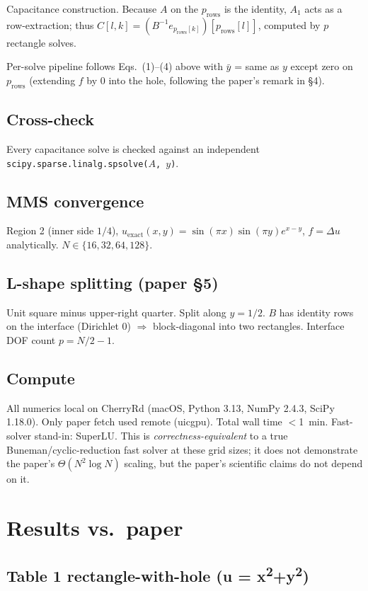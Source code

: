 \documentclass[11pt]{article}
\begin{document}
Capacitance construction. Because $A$ on the $p_{\text{rows}}$ is the
identity, $A_1$ acts as a row-extraction; thus
$C[l,k] = (B^{-1} e_{p_{\text{rows}}[k]})[p_{\text{rows}}[l]]$, computed by $p$
rectangle solves.

Per-solve pipeline follows Eqs.~(1)--(4) above with $\bar y$ = same as $y$
except zero on $p_{\text{rows}}$ (extending $f$ by $0$ into the hole,
following the paper's remark in \S4).

\subsection{Cross-check}
Every capacitance solve is checked against an independent
\texttt{scipy.sparse.linalg.spsolve($A$, $y$)}.

\subsection{MMS convergence}
Region 2 (inner side $1/4$), $u_{\text{exact}}(x,y) = \sin(\pi x)\sin(\pi y) e^{x-y}$,
$f = \Delta u$ analytically. $N \in \{16, 32, 64, 128\}$.

\subsection{L-shape splitting (paper \S5)}
Unit square minus upper-right quarter. Split along $y = 1/2$. $B$ has
identity rows on the interface (Dirichlet 0) $\Rightarrow$ block-diagonal
into two rectangles. Interface DOF count $p = N/2 - 1$.

\subsection{Compute}
All numerics local on CherryRd (macOS, Python 3.13, NumPy 2.4.3, SciPy
1.18.0). Only paper fetch used remote (uicgpu). Total wall time
${<}$1~min. Fast-solver stand-in: SuperLU. This is
\emph{correctness-equivalent} to a true Buneman/cyclic-reduction fast
solver at these grid sizes; it does not demonstrate the paper's
$\Theta(N^2 \log N)$ scaling, but the paper's scientific claims do not
depend on it.

\section{Results vs.\ paper}

\subsection{Table 1 rectangle-with-hole (u = x\textsuperscript{2}+y\textsuperscript{2})}
\end{document}
